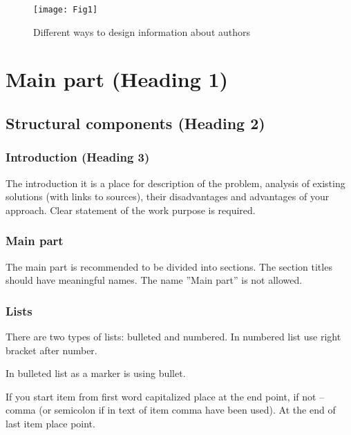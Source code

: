 \documentclass[conference]{IEEEtran}
\begin{document}
\begin{figure}[h]
	\centering
	\texttt{[image: Fig1]}
	\caption{Different ways to design information about authors}
	\label{fig1}
\end{figure}

\section{Main part (Heading 1)}

\subsection{Structural components (Heading 2)}

\subsubsection{Introduction (Heading 3)}
The introduction it is a place for description of the problem, analysis of existing solutions (with links to sources), their disadvantages and  advantages of your approach. Clear statement of the work purpose is required.  

\subsubsection{Main part}
The main part is recommended to be divided into sections. The section titles should have meaningful names. The name ''Main part'' is not allowed.

\subsubsection{Lists}
There are two types of lists: bulleted and numbered. In numbered list use right bracket after number. 


In bulleted list as a marker is using bullet. 


If you start item from first word capitalized place at the end point, if not -- comma (or semicolon if in text of item comma have been used). At the end of last item place point.
\end{document}
